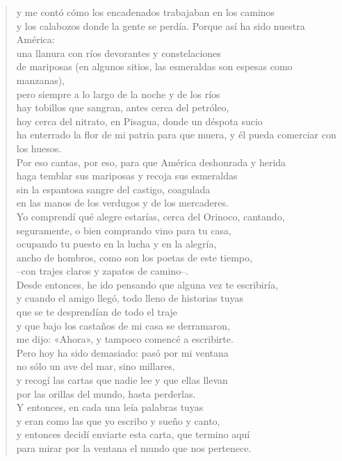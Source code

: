 \documentclass[12pt]{article}
\begin{document}
\begin{verse}
y me contó cómo los encadenados trabajaban en los caminos\\
y los calabozos donde la gente se perdía. Porque así ha sido nuestra América:\\
una llanura con ríos devorantes y constelaciones\\
de mariposas (en algunos sitios, las esmeraldas son espesas como manzanas),\\
pero siempre a lo largo de la noche y de los ríos\\
hay tobillos que sangran, antes cerca del petróleo,\\
hoy cerca del nitrato, en Pisagua, donde un déspota sucio\\
ha enterrado la flor de mi patria para que muera, y él pueda comerciar con los huesos.\\
Por eso cantas, por eso, para que América deshonrada y herida\\
haga temblar sus mariposas y recoja sus esmeraldas\\
sin la espantosa sangre del castigo, coagulada\\
en las manos de los verdugos y de los mercaderes.\\
Yo comprendí qué alegre estarías, cerca del Orinoco, cantando,\\
seguramente, o bien comprando vino para tu casa,\\
ocupando tu puesto en la lucha y en la alegría,\\
ancho de hombros, como son los poetas de este tiempo,\\
--con trajes claros y zapatos de camino--.\\
Desde entonces, he ido pensando que alguna vez te escribiría,\\
y cuando el amigo llegó, todo lleno de historias tuyas\\
que se te desprendían de todo el traje\\
y que bajo los castaños de mi casa se derramaron,\\
me dijo: «Ahora», y tampoco comencé a escribirte.\\
Pero hoy ha sido demasiado: pasó por mi ventana\\
no sólo un ave del mar, sino millares,\\
y recogí las cartas que nadie lee y que ellas llevan\\
por las orillas del mundo, hasta perderlas.\\
Y entonces, en cada una leía palabras tuyas\\
y eran como las que yo escribo y sueño y canto,\\
y entonces decidí enviarte esta carta, que termino aquí\\
para mirar por la ventana el mundo que nos pertenece.  
\end{verse}
\end{document}
